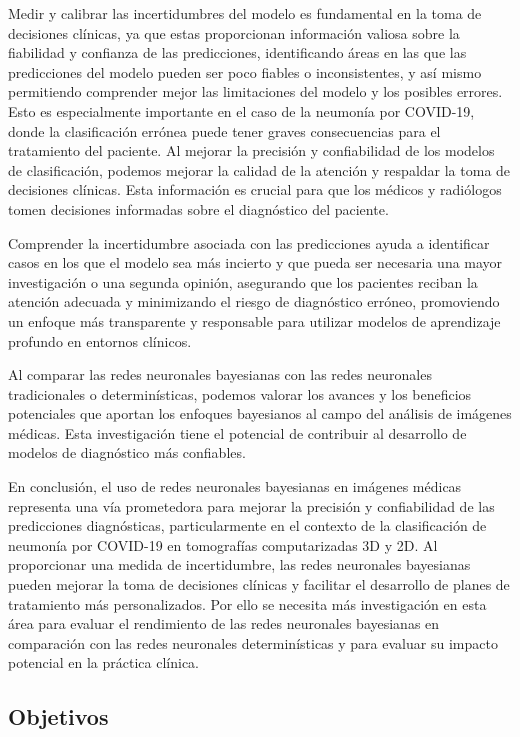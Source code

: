 \documentclass[10pt, oneside, a4paper]{article}
\begin{document}
	Medir y calibrar las incertidumbres del modelo es fundamental en la toma de decisiones clínicas, ya que estas proporcionan información valiosa sobre la fiabilidad y confianza de las predicciones, identificando áreas en las que las predicciones del modelo pueden ser poco fiables o inconsistentes, y así mismo permitiendo comprender mejor las limitaciones del modelo y los posibles errores. Esto es especialmente importante en el caso de la neumonía por COVID-19, donde la clasificación errónea puede tener graves consecuencias para el tratamiento del paciente. Al mejorar la precisión y confiabilidad de los modelos de clasificación, podemos mejorar la calidad de la atención y respaldar la toma de decisiones clínicas. Esta información es crucial para que los médicos y radiólogos tomen decisiones informadas sobre el diagnóstico del paciente. 
	
	Comprender la incertidumbre asociada con las predicciones ayuda a identificar casos en los que el modelo sea más incierto y que pueda ser necesaria una mayor investigación o una segunda opinión, asegurando que los pacientes reciban la atención adecuada y minimizando el riesgo de diagnóstico erróneo, promoviendo un enfoque más transparente y responsable para utilizar modelos de aprendizaje profundo en entornos clínicos.
		
	Al comparar las redes neuronales bayesianas con las redes neuronales tradicionales o determinísticas, podemos valorar los avances y los beneficios potenciales que aportan los enfoques bayesianos al campo del análisis de imágenes médicas. Esta investigación tiene el potencial de contribuir al desarrollo de modelos de diagnóstico más confiables.
	
	En conclusión, el uso de redes neuronales bayesianas en imágenes médicas representa una vía prometedora para mejorar la precisión y confiabilidad de las predicciones diagnósticas, particularmente en el contexto de la clasificación de neumonía por COVID-19 en tomografías computarizadas 3D y 2D. Al proporcionar una medida de incertidumbre, las redes neuronales bayesianas pueden mejorar la toma de decisiones clínicas y facilitar el desarrollo de planes de tratamiento más personalizados. Por ello se necesita más investigación en esta área para evaluar el rendimiento de las redes neuronales bayesianas en comparación con las redes neuronales determinísticas y para evaluar su impacto potencial en la práctica clínica.
	
	
	\subsection{Objetivos}
	
\end{document}
